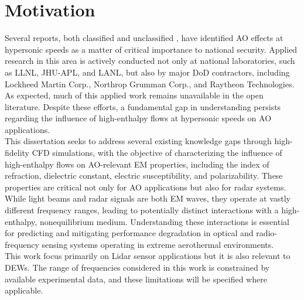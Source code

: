     \section{Motivation\label{ch1:motivation}}
    
Several reports, both classified and unclassified \cite{Jones2009,
ChiefScientistAirForce2010, Stone2022}, have identified \gls{AO} effects at
hypersonic speeds as a matter of critical importance to national security.
Applied research in this area is actively conducted not only at national
laboratories, such as \gls{LLNL}, \gls{JHU}-\gls{APL}, and \gls{LANL}, but
also by major \gls{DoD} contractors, including Lockheed Martin Corp.,
Northrop Grumman Corp., and Raytheon Technologies. As expected, much of this
applied work remains unavailable in the open literature. Despite these
efforts, a fundamental gap in understanding persists regarding the influence of
high-enthalpy flows at hypersonic speeds on \gls{AO} applications. \\

This dissertation seeks to address several existing knowledge gaps through
high-fidelity \gls{CFD} simulations, with the objective of characterizing the
influence of high-enthalpy flows on \gls{AO}-relevant \gls{EM}
properties, including the index of refraction, dielectric constant, electric
susceptibility, and polarizability. These properties are critical not only for
\gls{AO} applications but also for radar systems. While light beams and radar
signals are both \gls{EM} waves, they operate at vastly different frequency
ranges, leading to potentially distinct interactions with a high-enthalpy,
nonequilibrium medium. Understanding these interactions is essential for
predicting and mitigating performance degradation in optical and
radio-frequency sensing systems operating in extreme aerothermal
environments. \\

This work focus primarily on \gls{Lidar} sensor applications but it is also
relevant to \glspl{DEW}. The range of frequencies considered in this work is
constrained by available experimental data, and these limitations will be
specified where applicable.\\

